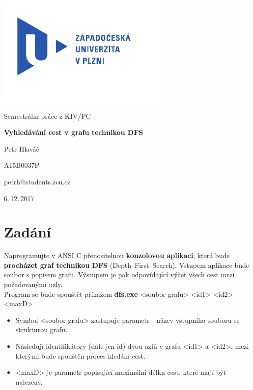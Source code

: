 \documentclass[
12pt,
a4paper,
pdftex,
czech,
titlepage
]{report}
\begin{document}
\begin{titlepage}
	\vspace*{-2cm}
	{\centering\includegraphics[scale=1.0]{logo.pdf}\par}
	\centering
	\vspace*{2cm}
	{\Large Semestrální práce z KIV/PC\par}
	\vspace{1.5cm}
	{\Huge\bfseries Vyhledávání cest v grafu technikou DFS\par}
	\vspace{2cm}

	{\Large Petr Hlaváč\par}
	{\Large A15B0037P\par}
	{\Large petrh@students.zcu.cz\par}

	\vfill

	{\Large 6.\,12.\,2017}
\end{titlepage}

\tableofcontents
\thispagestyle{empty}
\clearpage

\chapter{Zadání}
Naprogramujte v ANSI C přenositelnou \textbf{konzolovou aplikaci}, která bude \textbf{procházet graf technikou DFS} (Depth--First--Search). Vstupem aplikace bude soubor s popisem grafu. Výstupem je pak odpovídající výčet všech cest mezi požadovanými uzly.\\

Program se bude spouštět příkazem \textbf{dfs.exe} <soubor-grafu> <id1> <id2> <maxD>
\begin{itemize}
\item Symbol <soubor-grafu> zastupuje parametr - název vstupního souboru se strukturou grafu.
\item Následují identifikátory (dále jen id) dvou uzlů v grafu <id1> a <id2>, mezi kterými bude spouštěn proces hledání cest.
\item <maxD> je parametr popisující maximální délku cest, které mají být nalezeny.
\end{itemize}
\end{document}
